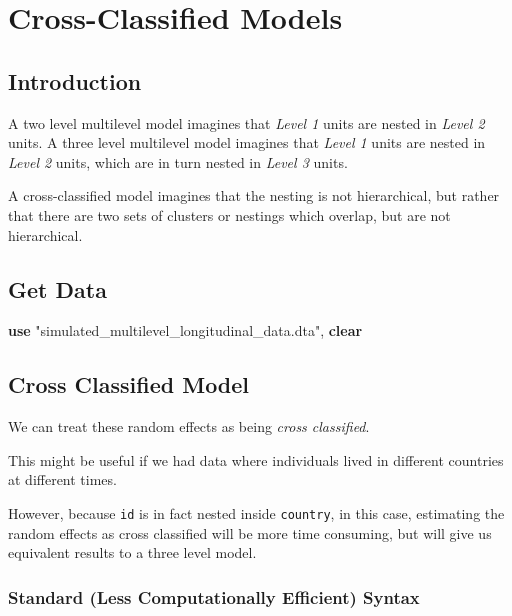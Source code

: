 \documentclass[
  letterpaper,
  DIV=11,
  numbers=noendperiod]{scrreprt}
\newenvironment{Shaded}{\begin{snugshade}}{\end{snugshade}}
\newcommand{\KeywordTok}[1]{\textcolor[rgb]{0.00,0.23,0.31}{\textbf{#1}}}
\newcommand{\NormalTok}[1]{\textcolor[rgb]{0.00,0.23,0.31}{#1}}
\newcommand{\StringTok}[1]{\textcolor[rgb]{0.13,0.47,0.30}{#1}}
\begin{document}

\chapter{Cross-Classified Models}\label{cross-classified-models}

\section{Introduction}\label{introduction-2}

A two level multilevel model imagines that \emph{Level 1} units are
nested in \emph{Level 2} units. A three level multilevel model imagines
that \emph{Level 1} units are nested in \emph{Level 2} units, which are
in turn nested in \emph{Level 3} units.

A cross-classified model imagines that the nesting is not hierarchical,
but rather that there are two sets of clusters or nestings which
overlap, but are not hierarchical.

\section{Get Data}\label{get-data-2}

\begin{Shaded}
\begin{Highlighting}[]

\KeywordTok{use} \StringTok{"simulated\_multilevel\_longitudinal\_data.dta"}\NormalTok{, }\KeywordTok{clear}
\end{Highlighting}
\end{Shaded}

\section{Cross Classified Model}\label{cross-classified-model}

We can treat these random effects as being \emph{cross classified}.

This might be useful if we had data where individuals lived in different
countries at different times.

However, because \texttt{id} is in fact nested inside \texttt{country},
in this case, estimating the random effects as cross classified will be
more time consuming, but will give us equivalent results to a three
level model.

\subsection{Standard (Less Computationally Efficient)
Syntax}\label{standard-less-computationally-efficient-syntax}
\end{document}
